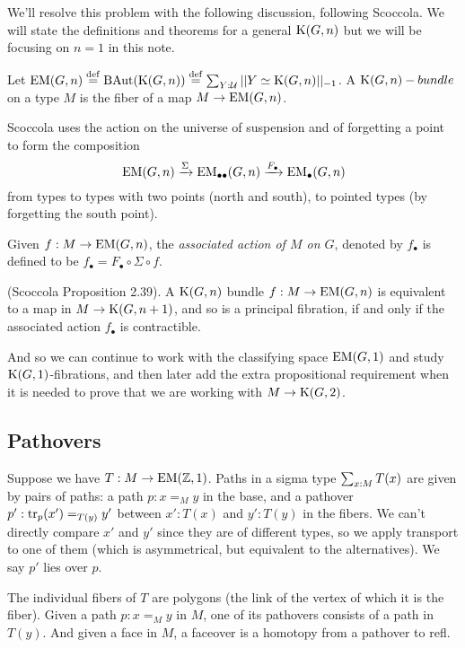 We'll resolve this problem with the following discussion, following Scoccola\cite{sco}. We will state the definitions and theorems for a general \( \mathrm{K}(G,n) \) but we will be focusing on \( n=1 \) in this note.

\begin{mydef}
Let \( \mathrm{EM}(G,n)\stackrel{\mathrm{def}}{=} \mathrm{BAut}(\mathrm{K}(G,n))\stackrel{\mathrm{def}}{=} \sum_{Y:\mathcal{U}}||Y\simeq \mathrm{K}(G,n)||_{-1}\). A \( \mathrm{K}(G,n)-bundle \) on a type \( M \) is the fiber of a map \( M\to\mathrm{EM}(G,n) \).
\end{mydef}

Scoccola uses the action on the universe of suspension and of forgetting a point to form the composition 
\[ 
\mathrm{EM}(G,n)\xrightarrow[]{\Sigma} \mathrm{EM}_{\bullet\bullet}(G,n)\xrightarrow[]{F_\bullet}\mathrm{EM_{\bullet}}(G,n)
\]
from types to types with two points (north and south), to pointed types (by forgetting the south point).

\begin{mydef}
Given \( f:M\to\mathrm{EM}(G,n) \), the \emph{associated action of \( M \) on \( G \)}, denoted by \( f_\bullet \) is defined to be \( f_\bullet=F_\bullet\circ\Sigma\circ f \).
\end{mydef}

\begin{mythm}
(Scoccola\cite{sco} Proposition 2.39). A \( \mathrm{K}(G,n) \) bundle \( f:M\to\mathrm{EM}(G,n) \) is equivalent to a map in \( M\to\mathrm{K}(G,n+1) \), and so is a principal fibration, if and only if the associated action \( f_\bullet \) is contractible.
\end{mythm}

And so we can continue to work with the classifying space \( \mathrm{EM}(G,1) \) and study \( \mathrm{K}(G,1) \)-fibrations, and then later add the extra propositional requirement when it is needed to prove that we are working with \( M\to\mathrm{K}(G,2) \).

\subsection{Pathovers}
Suppose we have \( T:M\to\mathrm{EM}(\mathbb{Z},1) \). Paths in a sigma type \( \sum_{x:M}T(x) \) are given by pairs of paths: a path \( p:x=_M y \) in the base, and a pathover \( p':\mathrm{tr}_p(x')=_{T(y)}y' \) between \( x':T(x) \) and \( y':T(y) \) in the fibers. We can't directly compare \( x' \) and \( y' \) since they are of different types, so we apply transport to one of them (which is asymmetrical, but equivalent to the alternatives). We say \( p' \) lies over \( p \). 

The individual fibers of \( T \) are polygons (the link of the vertex of which it is the fiber). Given a path \( p:x=_M y \) in \( M \), one of its pathovers consists of a path in \( T(y) \). And given a face in \( M \), a faceover is a homotopy from a pathover to refl.

